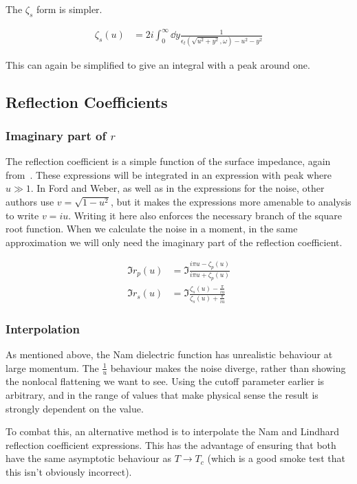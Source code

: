 \documentclass[../main.tex]{subfiles}
\begin{document}
	The $\zeta_s$ form is simpler.

	\begin{align}
		\zeta_s(u) &= 2i \int_0^\infty \dd{y} \frac{1}{\epsilon_t(\sqrt{u^2 + y^2}, \omega) - u^2 - y^2}
	\end{align}

	This can again be simplified to give an integral with a peak around one.

	\subsection{Reflection Coefficients} \label{subsec:nce:reflectcoefs}
	\subsubsection{Imaginary part of $r$}

	The reflection coefficient is a simple function of the surface impedance, again from~\cite{Ford1984}.
	These expressions will be integrated in an expression with peak where $u \gg 1$.
	In Ford and Weber, as well as in the expressions for the noise, other authors use $v = \sqrt{1 - u^2}$, but it makes the expressions more amenable to analysis to write $v = i u$.
	Writing it here also enforces the necessary branch of the square root function.
	When we calculate the noise in a moment, in the same approximation we will only need the imaginary part of the reflection coefficient.

	\begin{align}
		\Im r_p(u) &= \Im \frac{i \pi u - \zeta_p(u)}{i \pi u + \zeta_p(u)} \\
		\Im r_s(u) &= \Im \frac{\zeta_s(u) - \frac{\pi}{i u}}{\zeta_s(u) + \frac{\pi}{i u}}
	\end{align}

	\subsubsection{Interpolation}

	As mentioned above, the Nam dielectric function has unrealistic behaviour at large momentum.
	The $\frac{1}{u}$ behaviour makes the noise diverge, rather than showing the nonlocal flattening we want to see.
	Using the cutoff parameter earlier is arbitrary, and in the range of values that make physical sense the result is strongly dependent on the value.

	To combat this, an alternative method is to interpolate the Nam and Lindhard reflection coefficient expressions.
	This has the advantage of ensuring that both have the same asymptotic behaviour as $T \rightarrow T_c$ (which is a good smoke test that this isn't obviously incorrect).
\end{document}
